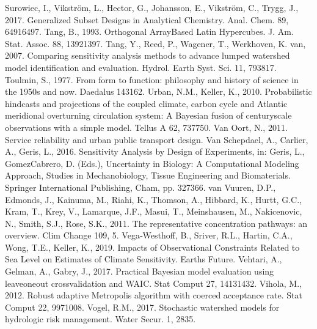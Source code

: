 \documentclass[letterpaper,10pt,english]{sphinxmanual}
\begin{document}
Surowiec, I., Vikström, L., Hector, G., Johansson, E., Vikström, C., Trygg, J., 2017. Generalized Subset Designs in Analytical Chemistry. Anal. Chem. 89, 6491\textendash{}6497. 
Tang, B., 1993. Orthogonal Array\sphinxhyphen{}Based Latin Hypercubes. J. Am. Stat. Assoc. 88, 1392\textendash{}1397. 
Tang, Y., Reed, P., Wagener, T., Werkhoven, K. van, 2007. Comparing sensitivity analysis methods to advance lumped watershed model identification and evaluation. Hydrol. Earth Syst. Sci. 11, 793\textendash{}817. 
Toulmin, S., 1977. From form to function: philosophy and history of science in the 1950s and now. Daedalus 143\textendash{}162.
Urban, N.M., Keller, K., 2010. Probabilistic hindcasts and projections of the coupled climate, carbon cycle and Atlantic meridional overturning circulation system: A Bayesian fusion of century\sphinxhyphen{}scale observations with a simple model. Tellus A 62, 737\textendash{}750.
Van Oort, N., 2011. Service reliability and urban public transport design.
Van Schepdael, A., Carlier, A., Geris, L., 2016. Sensitivity Analysis by Design of Experiments, in: Geris, L., Gomez\sphinxhyphen{}Cabrero, D. (Eds.), Uncertainty in Biology: A Computational Modeling Approach, Studies in Mechanobiology, Tissue Engineering and Biomaterials. Springer International Publishing, Cham, pp. 327\textendash{}366. 
van Vuuren, D.P., Edmonds, J., Kainuma, M., Riahi, K., Thomson, A., Hibbard, K., Hurtt, G.C., Kram, T., Krey, V., Lamarque, J.\sphinxhyphen{}F., Masui, T., Meinshausen, M., Nakicenovic, N., Smith, S.J., Rose, S.K., 2011. The representative concentration pathways: an overview. Clim Change 109, 5. 
Vega‐Westhoff, B., Sriver, R.L., Hartin, C.A., Wong, T.E., Keller, K., 2019. Impacts of Observational Constraints Related to Sea Level on Estimates of Climate Sensitivity. Earths Future. 
Vehtari, A., Gelman, A., Gabry, J., 2017. Practical Bayesian model evaluation using leave\sphinxhyphen{}one\sphinxhyphen{}out cross\sphinxhyphen{}validation and WAIC. Stat Comput 27, 1413\textendash{}1432.
Vihola, M., 2012. Robust adaptive Metropolis algorithm with coerced acceptance rate. Stat Comput 22, 997\textendash{}1008. 
Vogel, R.M., 2017. Stochastic watershed models for hydrologic risk management. Water Secur. 1, 28\textendash{}35. 
\end{document}
